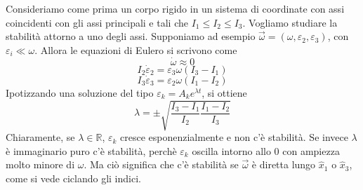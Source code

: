 \documentclass[a4paper,11pt]{article}
\begin{document}
\noindent Consideriamo come prima un corpo rigido in un sistema di coordinate con assi coincidenti con gli assi principali e tali che $I_1\leq I_2\leq I_3$. Vogliamo studiare la stabilità attorno a uno degli assi. Supponiamo ad esempio $\vec{\omega}=\left(\omega,\varepsilon_2,\varepsilon_3\right)$, con $\varepsilon_i\ll\omega$. Allora le equazioni di Eulero si scrivono come
\[\dot{\omega}\approx0\]
\[I_2\dot{\varepsilon}_2=\varepsilon_3\omega(I_3-I_1)\]
\[I_3\dot{\varepsilon}_3=\varepsilon_2\omega(I_1-I_2)\]
Ipotizzando una soluzione del tipo $\varepsilon_k=A_ke^{\lambda t}$, si ottiene
\[\lambda=\pm\sqrt{\frac{I_3-I_1}{I_2}\frac{I_1-I_2}{I_3}}\]
Chiaramente, se $\lambda\in\mathbb{R}$, $\varepsilon_k$ cresce esponenzialmente e non c'è stabilità. Se invece $\lambda$ è immaginario puro c'è stabilità, perchè $\varepsilon_k$ oscilla intorno allo 0 con ampiezza molto minore di $\omega$. Ma ciò significa che c'è stabilità se $\vec\omega$ è diretta lungo $\hat{x}_1$ o $\hat{x}_3$, come si vede ciclando gli indici.
\end{document}

